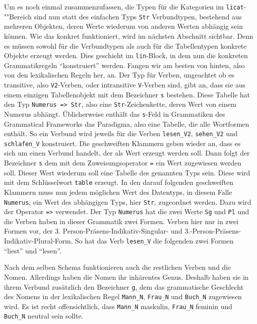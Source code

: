 Um es noch einmal zusammenzufassen, die Typen für die Kategorien im \texttt{licat}-""Bereich sind nun statt des einfachen Typs \texttt{Str} Verbundtypen, bestehend aus mehreren Objekten, deren Werte wiederum von anderen Werten abhängig sein können. Wie das konkret funktioniert, wird im nächsten Abschnitt sichtbar. Denn es müssen sowohl für die Verbundtypen als auch für die Tabellentypen konkrete Objekte erzeugt werden. Dies geschieht im \texttt{lin}-Block, in dem nun die konkreten Grammatikregeln "`konstruiert"' werden. Fangen wir am besten von hinten, also von den lexikalischen Regeln her, an. Der Typ für Verben, ungeachtet ob es transitive, also \texttt{V2}-Verben, oder intransitive \texttt{V}-Verben sind, gibt an, dass sie aus einem einzigen Tabellenobjekt mit dem Bezeichner \texttt{s} bestehen. Diese Tabelle hat den Typ \texttt{Numerus => Str}, also eine \texttt{Str}-Zeichenkette, deren Wert von einem Numerus abhängt. Üblicherweise enthält das \texttt{s}-Feld in Grammatiken des Grammatical Frameworks das Paradigma, also eine Tabelle, die alle Wortformen enthält. So ein Verbund wird jeweils für die Verben \texttt{lesen\_V2}, \texttt{sehen\_V2} und \texttt{schlafen\_V} konstruiert. Die geschweiften Klammern geben wieder an, dass es sich um einen Verbund handelt, der als Wert erzeugt werden soll. Dann folgt der Bezeichner \texttt{s} dem mit dem Zuweisungsoperator \texttt{=} ein Wert zugewiesen werden soll. Dieser Wert wiederum soll eine Tabelle des genannten Typs sein. Diese wird mit dem Schlüsselwort \texttt{table} erzeugt. In den darauf folgenden geschweiften Klammern muss nun jedem möglichen Wert des Datentyps, in diesem Falle \texttt{Numerus}, ein Wert des abhängigen Typs, hier \texttt{Str}, zugeordnet werden. Dazu wird der Operator \texttt{=>} verwendet. Der Typ \texttt{Numerus} hat die zwei Werte \texttt{Sg} und \texttt{Pl} und die Verben haben in dieser Grammatik zwei Formen. Verben hier nur in zwei Formen vor, der 3. Person-Präsens-Indikativ-Singular- und 3.-Person-Präsens-Indikativ-Plural-Form. So hat das Verb \texttt{lesen\_V} die folgenden zwei Formen "`liest"' und "`lesen"'. \par
Nach dem selben Schema funktionieren auch die restlichen Verben und die Nomen. Allerdings haben die Nomen ihr inhärentes Genus. Deshalb haben sie in ihrem Verbund zusätzlich den Bezeichner \texttt{g}, dem das grammatische Geschlecht des Nomens in der lexikalischen Regel \texttt{Mann\_N}, \texttt{Frau\_N} und \texttt{Buch\_N} zugewiesen wird. Es ist recht offensichtlich, dass \texttt{Mann\_N} maskulin, \texttt{Frau\_N} feminin und \texttt{Buch\_N} neutral sein sollte. \par
